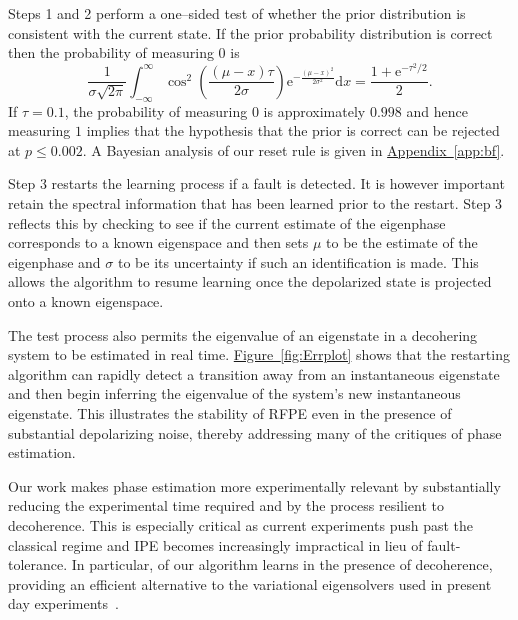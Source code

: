 \documentclass[aps,pra,amsmath,twocolumn,amssymb,superscriptaddress]{revtex4-1}
\newcommand{\app}[1]{\hyperref[app:#1]{Appendix~\ref*{app:#1}}}
\newcommand{\fig}[1]{\hyperref[fig:#1]{Figure~\ref*{fig:#1}}}
\newcommand{\ee}{\mathrm{e}}
\begin{document}
Steps 1 and 2 perform a one--sided test of whether the prior distribution is consistent with the current state.
If the prior probability distribution is correct then the probability of measuring $0$ is
\begin{equation}
    \frac{1}{\sigma\sqrt{2\pi}}\int_{-\infty}^\infty \cos^2\left(\frac{(\mu-x)\tau}{2\sigma}\right)\ee^{-\frac{(\mu-x)^2}{2\sigma^2}} \mathrm{d}x = \frac{1+\ee^{-\tau^2/2}}{2}.
\end{equation}
If $\tau=0.1$, the probability of measuring $0$ is approximately $0.998$ and hence measuring $1$ implies that the hypothesis that the prior is correct can be rejected at $p \le 0.002$. A Bayesian analysis of our reset rule
is given in \app{bf}.

Step 3 restarts the learning process if a fault is detected. It is however important retain the spectral information that has been learned prior to the restart.  Step 3 reflects this by checking to see if the current estimate of the eigenphase corresponds to a known eigenspace and then sets $\mu$ to be the estimate of the eigenphase and $\sigma$ to be its uncertainty if such an identification is made.  This allows the algorithm to resume learning once the depolarized state is projected onto a known eigenspace.

The test process also permits the eigenvalue of an eigenstate in a decohering system to be estimated in real time. \fig{Errplot} shows that the restarting algorithm can rapidly detect a transition away from an instantaneous eigenstate and then begin inferring the eigenvalue of the system's new instantaneous eigenstate.  This illustrates the stability of RFPE even in the presence of substantial depolarizing noise, thereby addressing many of the critiques of phase estimation.


Our work makes phase estimation more
experimentally relevant by substantially reducing the
experimental time required and by the process resilient
to decoherence. This is especially critical as current experiments push past the classical
regime and IPE becomes increasingly impractical in lieu of fault-tolerance.
In particular, of our algorithm learns in the presence of decoherence, providing an efficient alternative to the
variational eigensolvers used in present day experiments~\cite{PMS+14,MBL+14,WHT15}.  
\end{document}
